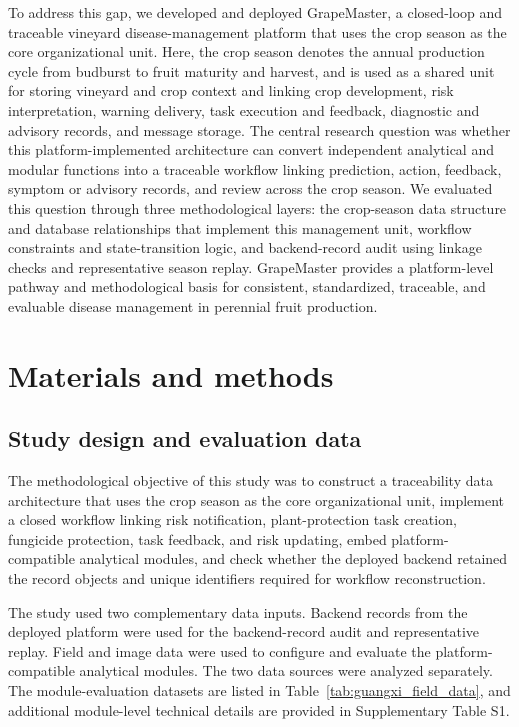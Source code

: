 \documentclass[12pt]{article}
\begin{document}
To address this gap, we developed and deployed GrapeMaster, a closed-loop and traceable vineyard disease-management platform that uses the crop season as the core organizational unit. Here, the crop season denotes the annual production cycle from budburst to fruit maturity and harvest, and is used as a shared unit for storing vineyard and crop context and linking crop development, risk interpretation, warning delivery, task execution and feedback, diagnostic and advisory records, and message storage. The central research question was whether this platform-implemented architecture can convert independent analytical and modular functions into a traceable workflow linking prediction, action, feedback, symptom or advisory records, and review across the crop season. We evaluated this question through three methodological layers: the crop-season data structure and database relationships that implement this management unit, workflow constraints and state-transition logic, and backend-record audit using linkage checks and representative season replay. GrapeMaster provides a platform-level pathway and methodological basis for consistent, standardized, traceable, and evaluable disease management in perennial fruit production.

\section{Materials and methods}\label{materials-and-methods}

\subsection{Study design and evaluation data}\label{study-design-and-evaluation-data}

The methodological objective of this study was to construct a traceability data architecture that uses the crop season as the core organizational unit, implement a closed workflow linking risk notification, plant-protection task creation, fungicide protection, task feedback, and risk updating, embed platform-compatible analytical modules, and check whether the deployed backend retained the record objects and unique identifiers required for workflow reconstruction.

The study used two complementary data inputs. Backend records from the deployed platform were used for the backend-record audit and representative replay. Field and image data were used to configure and evaluate the platform-compatible analytical modules. The two data sources were analyzed separately. The module-evaluation datasets are listed in Table~\ref{tab:guangxi_field_data}, and additional module-level technical details are provided in Supplementary Table S1.
\end{document}
